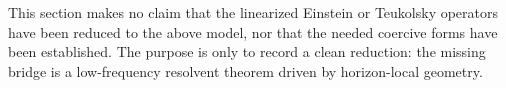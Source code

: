 \begin{remark}
This section makes no claim that the linearized Einstein or Teukolsky operators have been reduced to the above model, nor that the needed coercive forms have been established. The purpose is only to record a clean reduction: the missing bridge is a low-frequency resolvent theorem driven by horizon-local geometry.
\end{remark}

